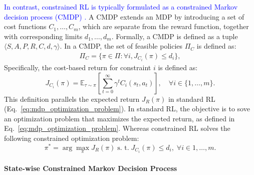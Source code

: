 \textcolor{blue}{In contrast, constrained RL is typically formulated as a constrained Markov decision process (CMDP) \cite{altman2021constrained}.}  %
A CMDP extends an MDP by introducing a set of cost functions $C_1, \ldots, C_m$, which are separate from the reward function, together with corresponding limits $d_1, \ldots, d_m$.
Formally, a CMDP is defined as a tuple $\langle S, A, P, R, C, d, \gamma \rangle$.
In a CMDP, the set of feasible policies $\Pi_C$ is defined as:
\begin{equation} \label{eq:feasible_policy_set_cmdp}
    \begin{aligned}
        \Pi_C = \{ \pi \in \Pi: \forall i, J_{C_i}(\pi) \leq d_i \},
    \end{aligned}
\end{equation}
Specifically, the cost-based return for constraint $i$ is defined as:
\begin{equation} \label{eq:cost_return}
    J_{C_i}(\pi) = \mathbb{E}_{\tau \sim \pi}\!\left[\sum^\infty_{t = 0} \gamma^t C_i(s_t, a_t)\right], 
    \quad \forall i \in \{1, \ldots, m\}.
\end{equation}
This definition parallels the expected return $J_R(\pi)$ in standard RL (Eq.~\ref{eq:mdp_optimization_problem}).
In standard RL, the objective is to sove an optimization problem that maximizes the expected return, as defined in Eq.~\eqref{eq:mdp_optimization_problem}.
Whereas constrained RL solves the following constrained optimization problem:
\begin{equation} \label{eq:cmdp_optimization_problem}
    \pi^* = \arg\max_\pi J_R(\pi) \; \text{s. t.} \; J_{C_i}(\pi) \leq d_i, \; \forall i \in {1, \ldots, m}.
\end{equation}


\paragraph{State-wise Constrained Markov Decision Process}


